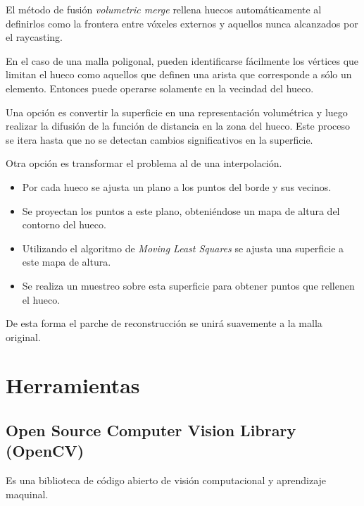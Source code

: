 		El método de fusión \emph{volumetric merge} rellena huecos
		automáticamente al definirlos como la frontera entre vóxeles externos y
		aquellos nunca alcanzados por el raycasting.

		En el caso de una malla poligonal,
		pueden identificarse fácilmente los vértices que limitan el hueco
		como aquellos que definen una arista que corresponde a sólo un elemento.
		Entonces puede operarse solamente en la vecindad del hueco.

		Una opción es convertir la superficie en una
		representación volumétrica y luego realizar la difusión de la función
		de distancia en la zona del hueco.
		Este proceso se itera hasta que no se detectan cambios significativos en la superficie.\cite{fillingholes}

		Otra opción es transformar el problema al de una interpolación.
		\begin{itemize}
			\item Por cada hueco se ajusta un plano a los puntos del borde y
				sus vecinos.
			\item Se proyectan los puntos a este plano, obteniéndose un mapa de
				altura del contorno del hueco.
			\item Utilizando el algoritmo de \emph{Moving Least Squares} se
				ajusta una superficie a este mapa de altura.
			\item Se realiza un muestreo sobre esta superficie para obtener
				puntos que rellenen el hueco.
		\end{itemize}
		De esta forma el parche de reconstrucción se unirá suavemente a la malla original.\cite{Filling_holes_on_locally_smooth_surfaces}





	\section{Herramientas}

		\subsection{Open Source Computer Vision Library (OpenCV)}
			Es una biblioteca de código abierto de
			visión computacional y aprendizaje maquinal.


